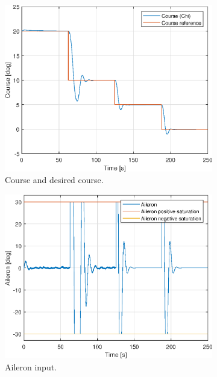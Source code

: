 \begin{figure}[ht]
	\centering
	\begin{subfigure}[b]{0.45\textwidth}
		\includegraphics[width=\textwidth]{figures/3g/chi_course.eps}
		\caption{Course and desired course. }
		\label{fig:3g_chi_course}
	\end{subfigure}
	\begin{subfigure}[b]{0.45\textwidth}
		\includegraphics[width=\textwidth]{figures/3g/delta_a_aileron.eps}
		\caption{Aileron input. }
		\label{fig:3g_delta_a_aileron}
	\end{subfigure}
	\begin{subfigure}[b]{0.45\textwidth}

\end{subfigure}
\end{figure}
